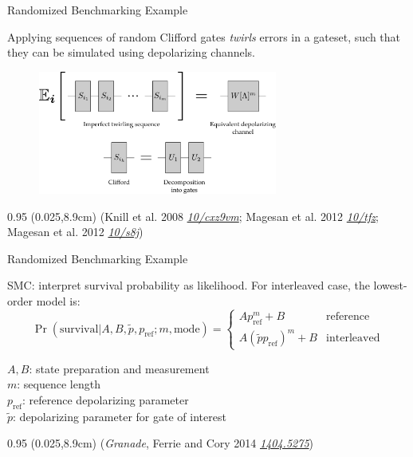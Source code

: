 \documentclass[xcolor=dvipsnames, compress]{beamer}
\renewcommand\UrlFont{\color{red}\rmfamily\itshape}
\newcommand{\shortdoi}[1]{\href{http://doi.org/#1}{\UrlFont 10/#1}}
\newcommand{\arxiv}[1]{\href{https://scirate.com/arxiv/#1}{\UrlFont #1}}
\newcommand{\bottomnote}[1]{
  \begin{textblock*}{0.95\paperwidth} (0.025\paperwidth,8.9cm)
    {\tiny \hfill #1}
  \end{textblock*}
}
\begin{document}
\begin{frame}{Randomized Benchmarking Example}

  Applying sequences of random Clifford gates \emph{twirls}
  errors in a gateset, such that they can be simulated
  using depolarizing channels.

  \begin{figure}
    \centering
    \includegraphics[width=0.7\textwidth]{benchmarking-overview}
  \end{figure}

  \bottomnote{(Knill et al. 2008 \shortdoi{cxz9vm}; Magesan et al. 2012 \shortdoi{tfz}; Magesan et al. 2012 \shortdoi{s8j})}

\end{frame}

\begin{frame}{Randomized Benchmarking Example}

  SMC: interpret survival probability as likelihood.
  For interleaved case, the lowest-order model is:
  \[
    \Pr(\text{survival} | A, B, \tilde{p}, p_{\text{ref}}; m, \text{mode}) =
    \begin{cases}
      A p_{\text{ref}}^m + B & \text{reference} \\
      A (\tilde{p} p_{\text{ref}})^m + B & \text{interleaved}
    \end{cases}
  \]

  $A,B$: state preparation and measurement \\
  $m$: sequence length \\
  $p_{\text{ref}}$: reference depolarizing parameter \\
  $\tilde{p}$: depolarizing parameter for gate of interest

  \bottomnote{(\emph{Granade}, Ferrie and Cory 2014 \arxiv{1404.5275})}

\end{frame}
\end{document}
